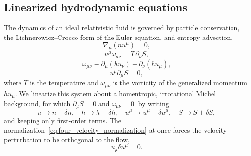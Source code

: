 \documentclass[12pt,a4paper,preprint,nopreprintline]{elsarticle}
\begin{document}
\subsection{Linearized hydrodynamic equations}
\label{sec:linearized_system}

The dynamics of an ideal relativistic fluid is governed by particle conservation, the Lich\-ne\-ro\-wicz--Crocco form of the Euler equation, and entropy advection,
\begin{equation}
    \nabla_{\mu}(nu^{\mu})=0,
    \label{eq:continuity}
\end{equation}
\begin{equation}
    u^{\mu}\omega_{\mu\nu}=T\,\partial_{\nu}S,
    \label{eq:euler_crocco}
\end{equation}
\begin{equation}
    \omega_{\mu\nu}
    \equiv
    \partial_{\mu}(hu_{\nu})-\partial_{\nu}(hu_{\mu}),
    \label{eq:vorticity_definition}
\end{equation}
\begin{equation}
    u^{\mu}\partial_{\mu}S=0,
    \label{eq:entropy_advection}
\end{equation}
where $T$ is the temperature and $\omega_{\mu\nu}$ is the vorticity of the generalized momentum $hu_{\mu}$. We linearize this system about a homentropic, irrotational Michel background, for which $\partial_{\mu}S=0$ and $\omega_{\mu\nu}=0$, by writing
\begin{equation}
    n\rightarrow n+\delta n,\quad
    h\rightarrow h+\delta h,\quad
    u^{\mu}\rightarrow u^{\mu}+\delta u^{\mu},\quad
    S\rightarrow S+\delta S,
    \label{eq:perturbation_expansion}
\end{equation}
and keeping only first-order terms. The normalization~\eqref{eq:four_velocity_normalization} at once forces the velocity perturbation to be orthogonal to the flow,
\begin{equation}
    u_{\mu}\delta u^{\mu}=0.
    \label{eq:velocity_orthogonality}
\end{equation}
\end{document}

